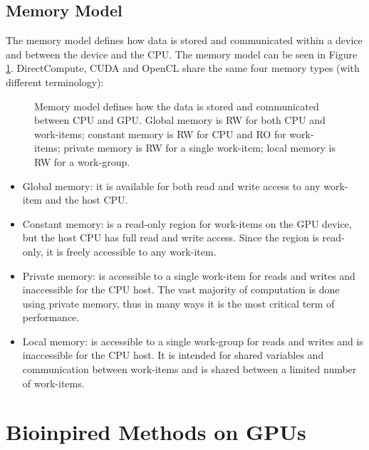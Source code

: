 \documentclass[prodmode,acmtecs]{acmsmall}
\begin{document}
\subsection{Memory Model}

The memory model defines how data is stored and communicated within a device and between the device and the CPU. The memory model can be seen in Figure \ref{figure:memory}. DirectCompute, CUDA and OpenCL share the same four memory types (with different terminology):

\begin{figure}
\centerline{}
\caption{Memory model defines how the data is stored and communicated between CPU and GPU. Global memory is RW for both CPU and work-items; constant memory is RW for CPU and RO for work-items; private memory is RW for a single work-item; local memory is RW for a work-group.}
\label{figure:memory}
\end{figure}

\begin{itemize}
\item Global memory: it is available for both read and write access to any work-item and the host CPU.
\item Constant memory: is a read-only region for work-items on the GPU device, but the host CPU has full read and write access. Since the region is read-only, it is freely accessible to any work-item.
\item Private memory: is accessible to a single work-item for reads and writes and inaccessible for the CPU host. The vast majority of computation is done using private memory, thus in many ways it is the most critical term of performance.
\item Local memory: is accessible to a single work-group for reads and writes and is inaccessible for the CPU host. It is intended for shared variables and communication between work-items and is shared between a limited number of work-items.
\end{itemize} 


\section{Bioinpired Methods on GPUs}
\label{sec:bioinfor_apps}
\end{document}
